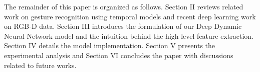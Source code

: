 The remainder of this paper is organized as follows. Section II reviews related work on gesture recognition using temporal models and recent deep learning work on RGB-D data. Section III introduces the formulation of our Deep Dynamic Neural Network model and the intuition behind the high level feature extraction. Section IV details the model implementation. Section V presents the experimental analysis and Section VI concludes the paper with discussions related to future works.


\endinput
